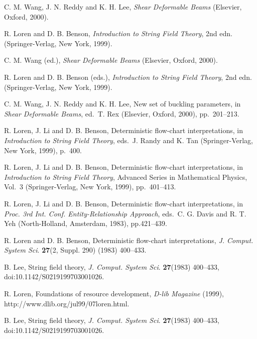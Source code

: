 \documentclass{ws-ijitdm}
\begin{document}
\begin{thebibliography}{00}
 C. M. Wang, J. N. Reddy and K. H. Lee, {\it Shear Deformable  
Beams} (Elsevier, Oxford, 2000).
	
 R. Loren and D. B. Benson, {\it Introduction to String Field
Theory}, 2nd edn. (Springer-Verlag, New York, 1999).  

 C. M. Wang (ed.), {\it Shear Deformable Beams} 
(Elsevier, Oxford, 2000).  

 R. Loren and D. B. Benson (eds.), {\it Introduction to 
String Field Theory}, 2nd edn. (Springer-Verlag, New York, 1999).  

 C. M. Wang, J. N. Reddy and K. H. Lee, New set of buckling
parameters, in {\it Shear Deformable Beams}, ed.~T. Rex 
(Elsevier, Oxford, 2000), pp.~201--213.

 R. Loren, J. Li and D. B. Benson, Deterministic flow-chart 
interpretations, in {\it Introduction to String Field Theory}, 
eds.~J. Randy and K. Tan (Springer-Verlag, New York, 1999), p.~400.

 R. Loren, J. Li and D. B. Benson, Deterministic 
flow-chart interpretations, in {\it Introduction to String Field Theory},  
Advanced Series in Mathematical Physics, Vol.~3 
(Springer-Verlag, New York, 1999), pp.~401--413.  

 R. Loren, J. Li and D. B. Benson, Deterministic flow-chart 
interpretations, in {\it Proc. 3rd Int. Conf. Entity-Relationship 
Approach}, eds.~C. G. Davis and R. T. Yeh (North-Holland, Amsterdam, 1983), 
pp.421--439.

 R. Loren and D. B. Benson, Deterministic flow-chart 
interpretations, {\it J. Comput. System Sci}. {\bf 27}(2, Suppl. 290) 
(1983) 400--433.

 B. Lee, String field theory, {\it J. Comput. System Sci}. 
{\bf 27}(1983) 400--433, doi:10.1142/S0219199703001026.  

 R. Loren, Foundations of resource development, 
{\it D-lib Magazine} (1999), http://www.dlib.org/jul99/07loren.html.

 B. Lee, String field theory, {\it J. Comput. System Sci}. 
{\bf 27}(1983) 400--433, doi:10.1142/S0219199703001026.

\end{thebibliography}
\end{document}
